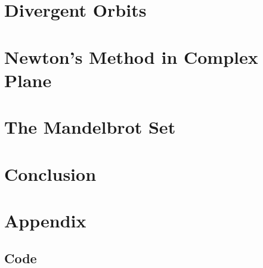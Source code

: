 \documentclass[letterpaper,11pt]{article}
\begin{document}
\section{Divergent Orbits}

\section{Newton's Method in Complex Plane}

\section{The Mandelbrot Set}

\section{Conclusion}

\section{Appendix}

\subsection{Code}

\end{document}
